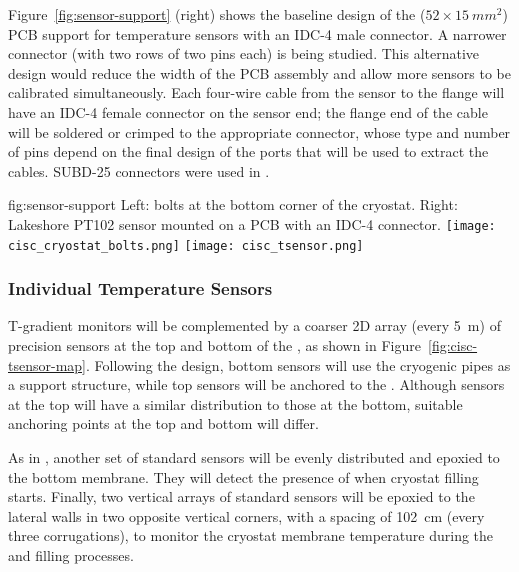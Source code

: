 Figure~\ref{fig:sensor-support} (right) shows the baseline design of the ($52\times \SI{15}{mm^2}$) PCB support for temperature sensors with an IDC-4 male connector. A narrower connector (with two rows of two pins each) is being studied. This alternative design would reduce the width of the PCB assembly and allow more sensors to be calibrated simultaneously. Each four-wire cable from the sensor to the flange will have an IDC-4 female connector on the sensor end; the flange end of the cable will be soldered or crimped to the appropriate connector, whose type and number of pins  depend on the final design of the  ports that will be used to extract the cables. SUBD-25 connectors were used in .

\begin{dunefigure}{fig:sensor-support}
  {Left: bolts at the bottom corner of the cryostat. Right: Lakeshore PT102 sensor mounted on a PCB with an IDC-4 connector.}
  \texttt{[image: cisc\_cryostat\_bolts.png]}%
    \hspace{1cm}%
  \texttt{[image: cisc\_tsensor.png]}%
\end{dunefigure}


\subsubsection{Individual Temperature Sensors}
\label{sec:fdgen-slow-cryo-individual-therm}

T-gradient monitors will be complemented by a coarser 2D array (every \SI{5}{m}) of precision sensors at the top and bottom of the , as shown in Figure~\ref{fig:cisc-tsensor-map}. Following the  design, bottom sensors will use the cryogenic pipes as a support structure, while top sensors will be anchored to the . Although sensors at the top will have a similar distribution to those at the bottom, %
suitable anchoring points at the top and bottom will differ. 

As in , another set of standard sensors will be evenly distributed and epoxied to the bottom membrane. They will detect the presence of  when cryostat filling starts. Finally, two vertical arrays of standard sensors will be epoxied to the lateral walls in two opposite vertical corners, with a spacing of \SI{102}{cm} (every three corrugations), to monitor the cryostat membrane temperature during the \cooldown and filling processes. 

